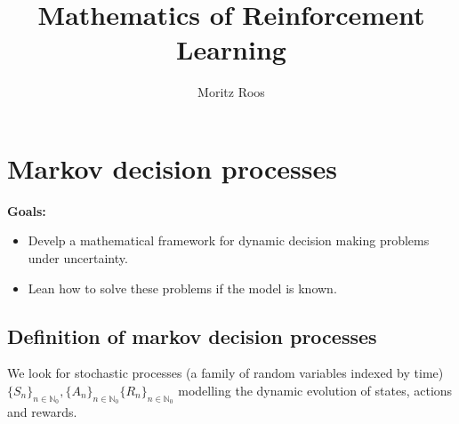 







\title{Mathematics of Reinforcement Learning}

\author{Moritz Roos}
\date{}

\maketitle

\tableofcontents


\clearpage
\section{Markov decision processes}

\textbf{Goals:}
\begin{itemize}
    \item Develp a mathematical framework for dynamic decision making problems under uncertainty.
    \item Lean how to solve these problems if the model is known.
\end{itemize}

\subsection{Definition of markov decision processes}
We look for stochastic processes (a family of random variables indexed by time) \( \{S_n\}_{n \in  \mathbb{N}_0 }, \{A_n\}_{n \in \mathbb{N}_{0}} \{R_n\}_{n \in \mathbb{N}_{0}} \) modelling the dynamic evolution of states, actions and rewards.

